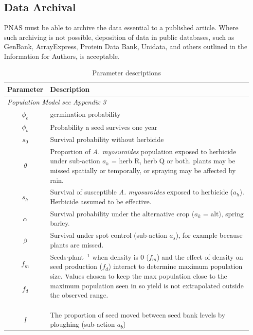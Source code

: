 \documentclass[9pt,twocolumn,twoside,lineno]{pnas-new}
\begin{document}
\subsection*{Data Archival}

PNAS must be able to archive the data essential to a published article. Where such archiving is not possible, deposition of data in public databases, such as GenBank, ArrayExpress, Protein Data Bank, Unidata, and others outlined in the Information for Authors, is acceptable.

\begin{table}%
\centering
\caption{Parameter descriptions}\label{tab:pars}	
\begin{tabular}{c p{6.5cm}}
Parameter & Description \\
\midrule
	\multicolumn{2}{l}{\textit{Population Model  see Appendix 3}}\\
	$\phi_e$ & germination probability \\ 
	$\phi_b$ & Probability a seed survives one year \\
	$s_0$ & Survival probability without herbicide \\
	$\theta$ & Proportion of \textit{A. myosuroides} population exposed to herbicide under sub-action $a_h$ = herb R, herb Q or both. plants may be missed spatially or temporally, or spraying may be affected by rain. \\       
	$s_h$ & Survival of susceptible \textit{A. myosuroides} exposed to herbicide ($a_h$). Herbicide assumed to be effective.\\
	$\alpha$ & Survival probability under the alternative crop ($a_k$ = alt), spring barley. \\
	$\beta$ & Survival under spot control (sub-action $a_s$), for example because plants are missed. \\
	$f_m$ & \multirow{2}{6.5cm}{\parbox[t]{6.5cm}{Seeds$\cdot$plant$^{-1}$ when density is 0 ($f_m$) and the effect of density on seed production ($f_d$) interact to determine maximum population size. Values chosen to keep the max population close to the maximum population seen in \citet{Quee2011} so yield is not extrapolated outside the observed range.}} \\
	$f_d$ & \\\\\\\\
	$I$ & The proportion of seed moved between seed bank levels by ploughing (sub-action $a_b$) \\ 

\end{tabular}
\end{table}
\end{document}
